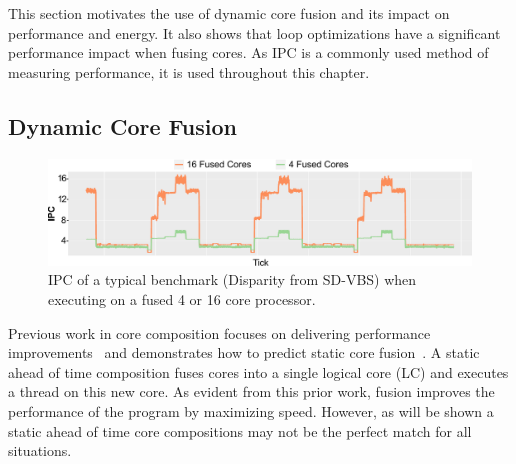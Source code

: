 This section motivates the use of dynamic core fusion and its impact on performance and energy.
It also shows that loop optimizations have a significant performance impact when fusing cores.
As IPC is a commonly used method of measuring performance, it is used throughout this chapter.

\subsection{Dynamic Core Fusion}
\begin{figure}[t]
    \centering
    \includegraphics[width=\textwidth]{cases-paper/graphics/motivation/disp_opt_4_16_3.pdf}
    \caption{IPC of a typical benchmark (Disparity from SD-VBS) when executing on a fused 4 or 16 core processor.} 
    \label{fig:disp_ex}
\end{figure}




Previous work in core composition focuses on delivering performance improvements~\cite{ipek2007CoreFusion,kim2007tflex} and demonstrates how to predict static core fusion~\cite{micolet2016dmpstream}.
A static ahead of time composition fuses cores into a single logical core (LC) and executes a thread on this new core.
As evident from this prior work, fusion improves the performance of the program by maximizing speed.
However, as will be shown a static ahead of time core compositions may not be the perfect match for all situations.

